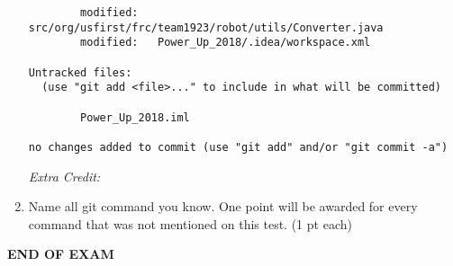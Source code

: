 \documentclass[11pt,fleqn]{article}
\begin{document}
\begin{enumerate}
\begin{verbatim}
        modified:  src/org/usfirst/frc/team1923/robot/utils/Converter.java
        modified:   Power_Up_2018/.idea/workspace.xml

Untracked files:
  (use "git add <file>..." to include in what will be committed)

        Power_Up_2018.iml

no changes added to commit (use "git add" and/or "git commit -a")
\end{verbatim}


\vspace{15ex}


\textit{Extra Credit:} %
    \item Name all git command you know. One point will be awarded for every command that was not mentioned on this test. (1 pt each)
\vspace{16ex}

\end{enumerate}
\vfill
	\begin{center}
		\textbf{END OF EXAM}
	\end{center}
\end{document}
